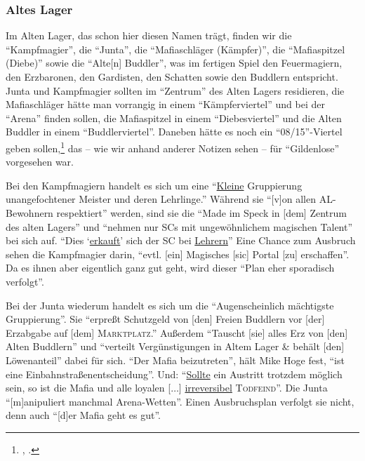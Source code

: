 \documentclass[a5paper,pagesize,numbers=noenddot]{scrbook}
\begin{document}
\subsubsection{Altes Lager}\label{sec:orpheus_welt_fraktionen_altes}
Im Alten Lager, das schon hier diesen Namen trägt, finden wir die \enquote{Kampfmagier},\autocite[S.~2]{orpheus_gildensystem} die \enquote{Junta},\autocite[S.~1]{orpheus_gildensystem} die \enquote{Mafiaschläger (Kämpfer)},\autocite[S.~4]{orpheus_gildensystem} die \enquote{Mafiaspitzel (Diebe)}\autocite[S.~5]{orpheus_gildensystem} sowie die \enquote{Alte[n] Buddler},\autocite[S.~3]{orpheus_gildensystem} was im fertigen Spiel den Feuermagiern, den Erzbaronen, den Gardisten, den Schatten sowie den Buddlern entspricht.
Junta und Kampfmagier sollten im \enquote{Zentrum}\autocite[S.~1, 2]{orpheus_gildensystem} des Alten Lagers residieren, die Mafiaschläger hätte man vorrangig in einem \enquote{Kämpferviertel} und bei der \enquote{Arena}\autocite[S.~4]{orpheus_gildensystem} finden sollen, die Mafiaspitzel in einem \enquote{Diebesviertel}\autocite[S.~5]{orpheus_gildensystem} und die Alten Buddler in einem \enquote{Buddlerviertel}.\autocite[S.~3]{orpheus_gildensystem}
Daneben hätte es noch ein \enquote{08/15}-Viertel geben sollen,\footnote{\autocite[S.~4]{orpheus_gildensystem}, \autocite[S.~12, 14\,f.]{orpheus_b_scribbles}.} das -- wie wir anhand anderer Notizen sehen -- für \enquote{Gildenlose}\autocite[S.~15]{orpheus_b_scribbles} vorgesehen war.

Bei den Kampfmagiern handelt es sich um eine \enquote{\uline{Kleine} Gruppierung unangefochtener Meister und deren Lehrlinge.}
Während sie \enquote{[v]on allen AL-Bewohnern respektiert} werden, sind sie die \enquote{Made im Speck in [dem] Zentrum des alten Lagers} und \enquote{nehmen nur SCs mit ungewöhnlichem magischen Talent} bei sich auf.
\enquote{Dies \enquote{\uline{erkauft}} sich der SC bei \uline{Lehrern}}
Eine Chance zum Ausbruch sehen die Kampfmagier darin, \enquote{evtl. [ein] Magisches [sic] Portal [zu] erschaffen}.
Da es ihnen aber eigentlich ganz gut geht, wird dieser \enquote{Plan eher sporadisch verfolgt}.\autocite[S.~2]{orpheus_gildensystem}

Bei der Junta wiederum handelt es sich um die \enquote{Augenscheinlich mächtigste Gruppierung}.
Sie \enquote{erpreßt Schutzgeld von [den] Freien Buddlern vor [der] Erzabgabe auf [dem] \textsc{Marktplatz}.}
Außerdem \enquote{Tauscht [sie] alles Erz von [den] Alten Buddlern} und \enquote{verteilt Vergünstigungen in Altem Lager \& behält [den] Löwenanteil} dabei für sich.
\enquote{Der Mafia beizutreten}, hält Mike Hoge fest, \enquote{ist eine Einbahnstraßenentscheidung}.
Und:
\enquote{\uline{Sollte} ein Austritt trotzdem möglich sein, so ist die Mafia und alle loyalen [$\ldots$] \uline{irreversibel} \textsc{Todfeind}}.
Die Junta \enquote{[m]anipuliert manchmal Arena-Wetten}.
Einen Ausbruchsplan verfolgt sie nicht, denn auch \enquote{[d]er Mafia geht es gut}.\autocite[S.~1]{orpheus_gildensystem}
\end{document}
